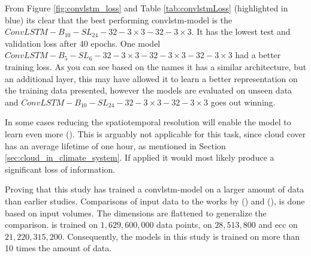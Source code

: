 
From Figure \ref{fig:convlstm_loss} and Table \ref{tab:convlstmLoss} (highlighted in blue) its clear that the best performing \acrshort{convlstm}-model is the $ConvLSTM-B_{10}-SL_{24}-32-3\times3-32-3 \times3$. It has the lowest test and validation loss after 40 epochs. One model $ConvLSTM-B_{5}-SL_{6}-32-3\times3-32-3 \times3-32-3 \times3$ had a better training loss. As you can see based on the names it has a similar architecture, but an additional layer, this may have allowed it to learn a better representation on the training data presented, however the models are evaluated on unseen data and $ConvLSTM-B_{10}-SL_{24}-32-3\times3-32-3 \times3$ goes out winning.


In some cases reducing the spatiotemporal resolution will enable the model to learn even more (\cite{precip_nowcasting}).
This is arguably not applicable for this task, since cloud cover has an average lifetime of one hour, as mentioned in Section \ref{sec:cloud_in_climate_system}. If applied it would most likely produce a significant loss of information.

Proving that this study has trained a \acrshort{convlstm}-model on a larger amount of data than earlier studies. Comparisons of input data to the works by \citeauthor{precip_nowcasting} (\citeyear{precip_nowcasting}) and \citeauthor{SunAirLSTM} (\citeyear{SunAirLSTM}), is done based on input volumes. The dimensions are flattened to generalize the comparison.  is trained on $1,629,600,000$ data points,  on $28,513,800$ and \acrshort{ecc} on $21,220,315,200$. Consequently, the models in this study is trained on more than 10 times the amount of data.

